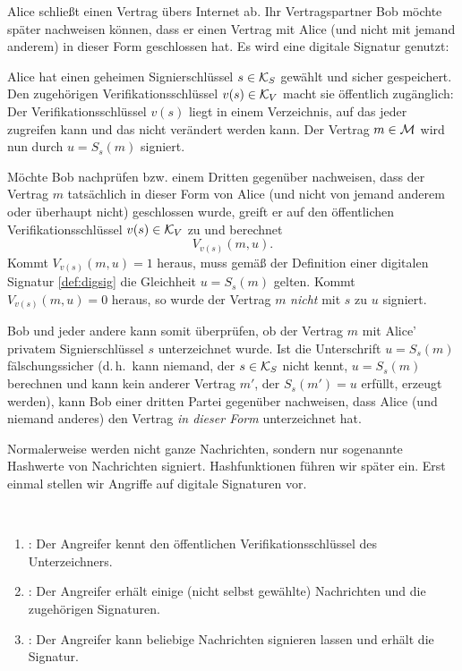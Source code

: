 \begin{example}
 Alice schließt einen Vertrag übers Internet ab. Ihr Vertragspartner Bob möchte später nachweisen können, dass er einen Vertrag mit Alice (und nicht mit jemand anderem) in dieser Form geschlossen hat. Es wird eine digitale Signatur genutzt:
 
 Alice hat einen geheimen Signierschlüssel $s \in \mathcal K_S$ gewählt und sicher gespeichert. Den zugehörigen Verifikationsschlüssel $v(s) \in \mathcal K_V$ macht sie öffentlich zugänglich: Der Verifikationsschlüssel $v(s)$ liegt in einem Verzeichnis, auf das jeder zugreifen kann und das nicht verändert werden kann. Der Vertrag $m \in \mathcal M$ wird nun durch $u = S_s(m)$ signiert. 
 
 Möchte Bob nachprüfen bzw. einem Dritten gegenüber nachweisen, dass der Vertrag $m$ tatsächlich in dieser Form von Alice (und nicht von jemand anderem oder überhaupt nicht) geschlossen wurde, greift er auf den öffentlichen Verifikationsschlüssel $v(s) \in \mathcal K_V$ zu und berechnet 
 \[V_{v(s)}(m, u).\] 
 Kommt $V_{v(s)}(m, u) = 1$ heraus, muss gemäß der Definition einer digitalen Signatur \ref{def:digsig} die Gleichheit $u = S_s(m)$ gelten. Kommt $V_{v(s)}(m, u) = 0$ heraus, so wurde der Vertrag $m$ \emph{nicht} mit $s$ zu $u$ signiert. 
 
 Bob und jeder andere kann somit überprüfen, ob der Vertrag $m$ mit Alice' privatem Signierschlüssel $s$ unterzeichnet wurde. Ist die Unterschrift $u = S_s(m)$ fälschungssicher (d.\,h.~kann niemand, der $s \in \mathcal K_S$ nicht kennt, $u = S_s(m)$ berechnen und kann kein anderer Vertrag $m'$, der $S_s(m') = u$ erfüllt, erzeugt werden), kann Bob einer dritten Partei gegenüber nachweisen, dass Alice (und niemand anderes) den Vertrag \emph{in dieser Form} unterzeichnet hat.
\end{example}

Normalerweise werden nicht ganze Nachrichten, sondern nur sogenannte Hashwerte von Nachrichten signiert. Hashfunktionen führen wir später ein. Erst einmal stellen wir Angriffe auf digitale Signaturen vor.

\begin{definition}{\ }
\begin{enumerate}
 \item {}: Der Angreifer kennt den öffentlichen Verifikationsschlüssel des Unterzeichners.
 \item {}: Der Angreifer erhält einige (nicht selbst gewählte) Nachrichten und die zugehörigen Signaturen.
 \item {}: Der Angreifer kann beliebige Nachrichten signieren lassen und erhält die Signatur.
\end{enumerate}
\end{definition}

